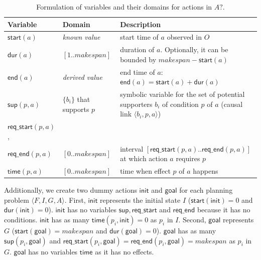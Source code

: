 \documentclass[runningheads]{llncs}
\newcommand{\tup}[1]{{\langle #1 \rangle}}
\newcommand{\dur}{\mathsf{dur}}    %
\newcommand{\start}{\mathsf{start}}%
\newcommand{\en}{\mathsf{end}}     %
\newcommand{\supp}{\mathsf{sup}}   %
\newcommand{\tim}{\mathsf{time}}   %
\newcommand{\reqs}{\mathsf{req\_{start}}} %
\newcommand{\reqe}{\mathsf{req\_{end}}}   %
\newcommand{\ini}{\mathsf{init}}   %
\newcommand{\goal}{\mathsf{goal}}  %
\begin{document}
\begin{table}
\begin{center}
\small
\begin{tabular}{p{2cm}p{2.7cm}p{7.4cm}}
Variable & Domain & Description \\

\hline


$\start(a)$ & \emph{known value} & start time of $a$ observed in $O$ \\
$\dur(a)$ & $[1..makespan]$ & duration of $a$. Optionally, it can be bounded by $makespan-\start(a)$\\
$\en(a)$ & \emph{derived value} & end time of $a$: $\en(a)=\start(a)+\dur(a)$ \\


$\supp(p,a)$ & $\{b_i\}$ that \newline supports $p$ & symbolic variable for the set of potential supporters $b_i$ of condition $p$ of $a$ (causal link $\tup{b_i,p,a}$) \\

$\reqs(p,a)$, \\
$\reqe(p,a)$ & $[0..makespan]$ & interval $[\reqs(p,a)..\reqe(p,a)]$ at which action $a$ requires $p$ \\

$\tim(p,a)$ & $[0..makespan]$ & time when effect $p$ of $a$ happens \\


\hline
\end{tabular}
\normalsize
\end{center}
\caption{Formulation of variables and their domains for actions in $A?$.}
\label{table:variables}
\end{table}


Additionally, we create two dummy actions $\ini$ and $\goal$ for each planning problem $\tup{F,I,G,A}$. First, $\ini$ represents the initial state $I$ ($\start(\ini)=0$ and $\dur(\ini)=0$). $\ini$ has no variables $\supp, \reqs$ and $\reqe$ because it has no conditions. $\ini$ has as many $\tim(p_i,\ini)=0$ as $p_i$ in $I$. Second, $\goal$ represents $G$ ($\start(\goal)=makespan$ and $\dur(\goal)=0$). $\goal$ has as many $\supp(p_i,\goal)$ and $\reqs(p_i,\goal)=\reqe(p_i,\goal)=makespan$ as $p_i$ in $G$. $\goal$ has no variables $\tim$ as it has no effects.
\end{document}
